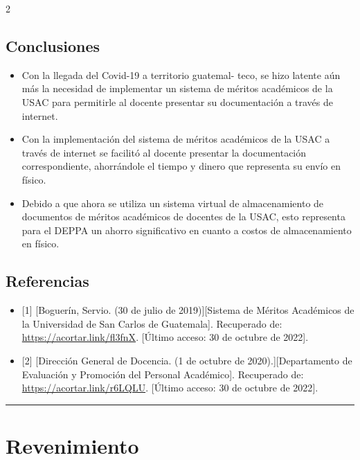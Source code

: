 \documentclass[12pt,spanish,Letterpaper,openany]{book}
\newcommand{\HRule}{\begin{center}\rule{0.5\linewidth}{0.2mm}\end{center}}
\begin{document}
\begin {multicols}{2}
\hypertarget{conclusiones-9}{%
\section{Conclusiones}\label{conclusiones-9}}

\begin{itemize}
\item
  Con la llegada del Covid-19 a territorio guatemal-
  teco, se hizo latente aún más la necesidad de implementar un sistema de méritos académicos de la USAC para permitirle al docente presentar su documentación a través de internet.
\item
  Con la implementación del sistema de méritos académicos de la USAC a través de internet se facilitó al docente presentar la documentación correspondiente, ahorrándole el tiempo y dinero que representa su envío en físico.
\item
  Debido a que ahora se utiliza un sistema virtual de almacenamiento de documentos de méritos académicos de docentes de la USAC, esto representa para el DEPPA un ahorro significativo en cuanto a costos de almacenamiento en físico.
\end{itemize}

\hypertarget{referencias-9}{%
\section{Referencias}\label{referencias-9}}

\begin{itemize}
\item
  {[}1{]} {[}Boguerín, Servio. (30 de julio de 2019){]}{[}Sistema de Méritos Académicos de la Universidad de San Carlos de Guatemala{]}. Recuperado de: \url{https://acortar.link/fl3fnX}. {[}Último acceso: 30 de octubre de 2022{]}.
\item
  {[}2{]} {[}Dirección General de Docencia. (1 de octubre de 2020).{]}{[}Departamento de Evaluación y Promoción del Personal Académico{]}. Recuperado de: \url{https://acortar.link/r6LQLU}. {[}Último acceso: 30 de octubre de 2022{]}.
\end{itemize}

\end {multicols}
\medskip
\HRule
\medskip

\hypertarget{Maldonado}{%
\chapter{Revenimiento}\label{Maldonado}}
\end{document}
